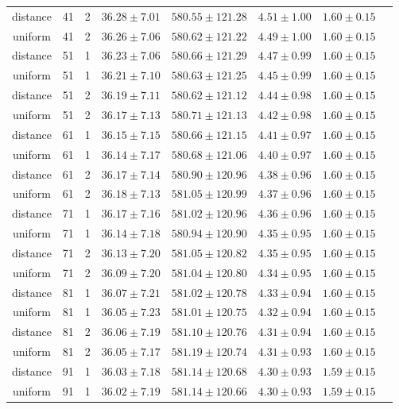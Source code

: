 \begin{tabular}{cccrrrrr}
distance & 41 & 2 & $36.28 \pm 7.01$ & $580.55 \pm 121.28$ & $4.51 \pm 1.00$ & $1.60 \pm 0.15$\\
uniform & 41 & 2 & $36.26 \pm 7.06$ & $580.62 \pm 121.22$ & $4.49 \pm 1.00$ & $1.60 \pm 0.15$\\
distance & 51 & 1 & $36.23 \pm 7.06$ & $580.66 \pm 121.29$ & $4.47 \pm 0.99$ & $1.60 \pm 0.15$\\
uniform & 51 & 1 & $36.21 \pm 7.10$ & $580.63 \pm 121.25$ & $4.45 \pm 0.99$ & $1.60 \pm 0.15$\\
distance & 51 & 2 & $36.19 \pm 7.11$ & $580.62 \pm 121.12$ & $4.44 \pm 0.98$ & $1.60 \pm 0.15$\\
uniform & 51 & 2 & $36.17 \pm 7.13$ & $580.71 \pm 121.13$ & $4.42 \pm 0.98$ & $1.60 \pm 0.15$\\
distance & 61 & 1 & $36.15 \pm 7.15$ & $580.66 \pm 121.15$ & $4.41 \pm 0.97$ & $1.60 \pm 0.15$\\
uniform & 61 & 1 & $36.14 \pm 7.17$ & $580.68 \pm 121.06$ & $4.40 \pm 0.97$ & $1.60 \pm 0.15$\\
distance & 61 & 2 & $36.17 \pm 7.14$ & $580.90 \pm 120.96$ & $4.38 \pm 0.96$ & $1.60 \pm 0.15$\\
uniform & 61 & 2 & $36.18 \pm 7.13$ & $581.05 \pm 120.99$ & $4.37 \pm 0.96$ & $1.60 \pm 0.15$\\
distance & 71 & 1 & $36.17 \pm 7.16$ & $581.02 \pm 120.96$ & $4.36 \pm 0.96$ & $1.60 \pm 0.15$\\
uniform & 71 & 1 & $36.14 \pm 7.18$ & $580.94 \pm 120.90$ & $4.35 \pm 0.95$ & $1.60 \pm 0.15$\\
distance & 71 & 2 & $36.13 \pm 7.20$ & $581.05 \pm 120.82$ & $4.35 \pm 0.95$ & $1.60 \pm 0.15$\\
uniform & 71 & 2 & $36.09 \pm 7.20$ & $581.04 \pm 120.80$ & $4.34 \pm 0.95$ & $1.60 \pm 0.15$\\
distance & 81 & 1 & $36.07 \pm 7.21$ & $581.02 \pm 120.78$ & $4.33 \pm 0.94$ & $1.60 \pm 0.15$\\
uniform & 81 & 1 & $36.05 \pm 7.23$ & $581.01 \pm 120.75$ & $4.32 \pm 0.94$ & $1.60 \pm 0.15$\\
distance & 81 & 2 & $36.06 \pm 7.19$ & $581.10 \pm 120.76$ & $4.31 \pm 0.94$ & $1.60 \pm 0.15$\\
uniform & 81 & 2 & $36.05 \pm 7.17$ & $581.19 \pm 120.74$ & $4.31 \pm 0.93$ & $1.60 \pm 0.15$\\
distance & 91 & 1 & $36.03 \pm 7.18$ & $581.14 \pm 120.68$ & $4.30 \pm 0.93$ & $1.59 \pm 0.15$\\
uniform & 91 & 1 & $36.02 \pm 7.19$ & $581.14 \pm 120.66$ & $4.30 \pm 0.93$ & $1.59 \pm 0.15$\\

\end{tabular}
